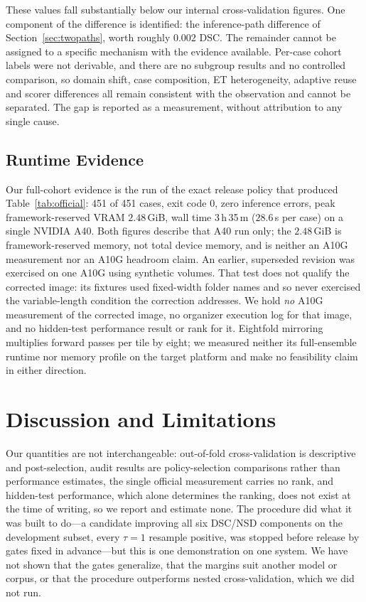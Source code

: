 \documentclass[runningheads]{llncs}
\begin{document}
These values fall substantially below our internal cross-validation figures. One component of the
difference is identified: the inference-path difference of Section~\ref{sec:twopaths}, worth roughly
$0.002$ DSC. The remainder cannot be assigned to a specific mechanism with the evidence available.
Per-case cohort labels were not derivable, and there are no subgroup results and no controlled
comparison, so domain shift, case composition, ET heterogeneity, adaptive reuse and scorer
differences all remain consistent with the observation and cannot be separated. The gap is reported
as a measurement, without attribution to any single cause.

\subsection{Runtime Evidence}
\label{sec:container}
Our full-cohort evidence is the run of the exact release policy that produced
Table~\ref{tab:official}: 451 of 451 cases, exit code $0$, zero inference errors, peak
framework-reserved VRAM $2.48$\,GiB, wall time 3\,h\,35\,m ($28.6$\,s per case) on a single NVIDIA
A40. Both figures describe that A40 run only; the $2.48$\,GiB is framework-reserved memory, not total
device memory, and is neither an A10G measurement nor an A10G headroom claim. An
earlier, superseded revision was exercised on one A10G using synthetic volumes. That test does not
qualify the corrected image: its fixtures used fixed-width folder names and so never exercised the
variable-length condition the correction addresses. We hold \emph{no} A10G measurement of the corrected image, no organizer
execution log for that image, and no hidden-test performance result or rank for it. Eightfold mirroring multiplies forward passes per tile by eight; we measured neither its
full-ensemble runtime nor memory profile on the target platform and make no feasibility claim in
either direction.

\section{Discussion and Limitations}
\label{sec:disc}
Our quantities are not interchangeable: out-of-fold cross-validation is descriptive and
post-selection, audit results are policy-selection comparisons rather than performance estimates, the
single official measurement carries no rank, and hidden-test performance, which alone determines the
ranking, does not exist at the time of writing, so we report and estimate none. The procedure did
what it was built to do---a
candidate improving all six DSC/NSD components on the development subset, every $\tau=1$ resample
positive, was stopped before release by gates fixed in advance---but this is one demonstration on one
system. We have not shown that the gates generalize, that the margins suit another model or corpus,
or that the procedure outperforms nested cross-validation, which we did not run.
\end{document}
